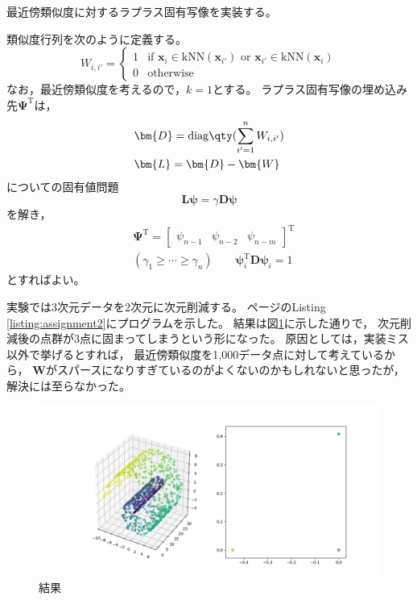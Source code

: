\documentclass[class=jsarticle, crop=false, dvipdfmx, fleqn]{standalone}
\begin{document}
\section{}

最近傍類似度に対するラプラス固有写像を実装する。

類似度行列を次のように定義する。
\begin{equation}
    W_{i, i'} =
        \begin{cases}
            1 & \text{if } \bm{x}_i \in \mathrm{kNN}(\bm{x}_{i'}) \text{ or } \bm{x}_{i'} \in \mathrm{kNN}(\bm{x}_i) \\
            0 & \text{otherwise}
        \end{cases}
\end{equation}
なお，最近傍類似度を考えるので，\(k = 1\)とする。
ラプラス固有写像の埋め込み先\(\bm{\Psi}^\mathrm{T}\)は，
\begin{align}
    & \bm{D} = \mathrm{diag}\qty(\sum_{i'=1}^{n} W_{i, i'}) \\
    & \bm{L} = \bm{D} - \bm{W}
\end{align}
についての固有値問題
\begin{equation}
    \bm{L} \bm{\psi} = \gamma \bm{D} \bm{\psi}
\end{equation}
を解き，
\begin{align}
    & \bm{\Psi}^\mathrm{T} =
        \begin{bmatrix}
            \psi_{n-1} & \psi_{n-2} & \psi_{n-m}
        \end{bmatrix}^\mathrm{T} \\
    & (\gamma_1 \ge \cdots \ge \gamma_n) \qquad \bm{\psi}_i^\mathrm{T} \bm{D} \bm{\psi}_i = 1
\end{align}
とすればよい。

実験では3次元データを2次元に次元削減する。
\pageref{listing:assignment2}ページのListing \ref{listing:assignment2}にプログラムを示した。
結果は図\ref{fig:result}に示した通りで，
次元削減後の点群が3点に固まってしまうという形になった。
原因としては，実装ミス以外で挙げるとすれば，
最近傍類似度を1,000データ点に対して考えているから，
\(\bm{W}\)がスパースになりすぎているのがよくないのかもしれないと思ったが，
解決には至らなかった。


\begin{figure}[H]
    \centering
    \includegraphics[clip, width=15cm]{../figures/assignment2_result}
    \caption{結果}
    \label{fig:result}
\end{figure}
\end{document}
